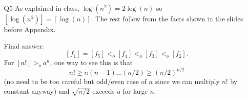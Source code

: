 \documentclass[t]{beamer}
\def\ge{\geqslant}
\begin{document}
\begin{frame}{Q5}
  As explained in class, $\log(n^2)=2\log(n)$ so $[\log(n^2)]= [\log(n)]$. The rest follow from the facts shown in the slides before Appendix. 
  \par Final answer:
  \[[f_1]=[f_5]<_o [f_4] <_o [f_3] <_o [f_2]. \]
  For $[n!] >_o a^n$, one way to see this is that 
  \[n! \ge n(n-1)\dots(n/2) \ge (n/2)^{n/2}\]
  (no need to be too careful but odd/even case of $n$ since we can multiply $n!$ by constant anyway) and $\sqrt{n/2}$ exceeds $a$ for large $n$. 
\end{frame}
\end{document}
